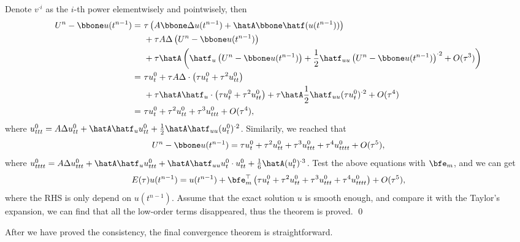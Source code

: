 Denote $v^{\cdot i}$ as the $i$-th power elementwisely and pointwisely, then
\begin{equation}\label{eq:semilinear-third}
    \begin{aligned}
    U^n - \bbone u(t^{n-1}) =~& \tau \left(A  \bbone\Delta u(t^{n-1}) + \hatA \bbone \hatf(u(t^{n-1})) \right)\\
    &+ \tau A \Delta\left(U^n - \bbone u(t^{n-1})\right) \\
    &+ \tau \hatA \left(\hatf_u\left(U^n - \bbone u(t^{n-1})\right) 
     + \frac12 \hatf_{uu}\left(U^n - \bbone u(t^{n-1})\right)^{\cdot2}  + O(\tau^3)\right)\\
    =~& \tau u_t^0 + \tau A\Delta \cdot \left(\tau u_t^0 + \tau^2 u_{tt}^0\right) \\
     & + \tau \hatA \hatf_u \cdot\left(\tau u_t^0 + \tau^2 u_{tt}^0\right)
     + \tau \hatA \frac12 \hatf_{uu} (\tau u_t^0)^{\cdot 2}  + O(\tau^4)\\
    =~& \tau u_t^0 + \tau^2 u_{tt}^0+ \tau^3 u_{ttt}^0 + O(\tau^4), 
    \end{aligned}
\end{equation}
where $u_{ttt}^0 = A \Delta u_{tt}^0 + \hatA \hatf_u u_{tt}^0 + \frac12 \hatA \hatf_{uu} (u_t^0)^{\cdot 2}$. 
Similarily, we reached that 
\begin{equation}\label{eq:semilinear-fourth}
    \begin{aligned}
    U^n - \bbone u(t^{n-1}) =  \tau u_t^0 + \tau^2 u_{tt}^0+ \tau^3 u_{ttt}^0+ \tau^4 u_{tttt}^0 + O(\tau^5), 
    \end{aligned}
\end{equation}
where $u_{tttt}^0 = A \Delta u_{ttt}^0 + \hatA \hatf_u u_{ttt}^0 + \hatA \hatf_{uu} u_t^0 \cdot u_{tt}^0 + \frac16 \hatA (u_t^0)^{\cdot 3}$. 
Test the above equations with $\bfe_m$, and we can get
$$E(\tau) u(t^{n-1}) = u(t^{n-1}) + \bfe_m^\top \left(\tau u_t^0 + \tau^2 u_{tt}^0+ \tau^3 u_{ttt}^0+ \tau^4 u_{tttt}^0\right) + O(\tau^5),$$
where the RHS is only depend on $u(t^{n-1})$. 
Assume that the exact solution $u$ is smooth enough, and compare it with the Taylor's expansion, 
we can find that all the low-order terms disappeared, thus the theorem is proved. \qed

After we have proved the consistency, the final convergence theorem is straightforward. 

